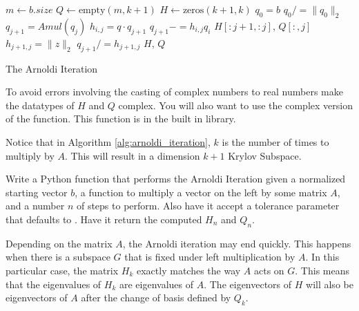 \begin{algorithm}
\begin{algorithmic}[1]
	\State $m \gets b.size$						
	\State $Q \gets \text{empty}\left(m, k+1\right)$
	\State $H \gets \text{zeros}\left( k+1, k\right)$
	\State $q_0 = b$							
	\State $q_0 /= \|q_0\|_2$						
								
		\State $q_{j+1} = Amul \left(q_j\right)$		
							
			\State $h_{i,j} = q \cdot q_{j+1}$		
			\State $q_{j+1} -= h_{i,j} q_i$
		\EndFor
							
			\State {} $H[:j+1,:j]$, $Q[:,j]$
		\EndIf
		\State $h_{j+1,j} = \|z\|_2$				
		\State $q_{j+1} /= h_{j+1,j}$				
	\EndFor
	\State {} $H$, $Q$
\EndProcedure
\end{algorithmic}
\caption{The Arnoldi Iteration}
\label{alg:arnoldi_iteration}
\end{algorithm}

\begin{info}
To avoid errors involving the casting of complex numbers to real numbers make the datatypes of $H$ and $Q$ complex.
You will also want to use the complex version of the  function.
This function is in the built in  library.
\end{info}

Notice that in Algorithm \ref{alg:arnoldi_iteration}, $k$ is the number of times to multiply by $A$.
This will result in a dimension $k+1$ Krylov Subspace.

\begin{problem}
Write a Python function that performs the Arnoldi Iteration given a normalized starting vector $b$, a function to multiply a vector on the left by some matrix $A$, and a number $n$ of steps to perform.
Also have it accept a tolerance parameter that defaults to .
Have it return the computed $H_n$ and $Q_n$.
\end{problem}

\begin{info}
Depending on the matrix $A$, the Arnoldi iteration may end quickly.
This happens when there is a subspace $G$ that is fixed under left multiplication by $A$.
In this particular case, the matrix $H_k$ exactly matches the way $A$ acts on $G$.
This means that the eigenvalues of $H_k$ are eigenvalues of $A$.
The eigenvectors of $H$ will also be eigenvectors of $A$ after the change of basis defined by $Q_k$.
\end{info}

